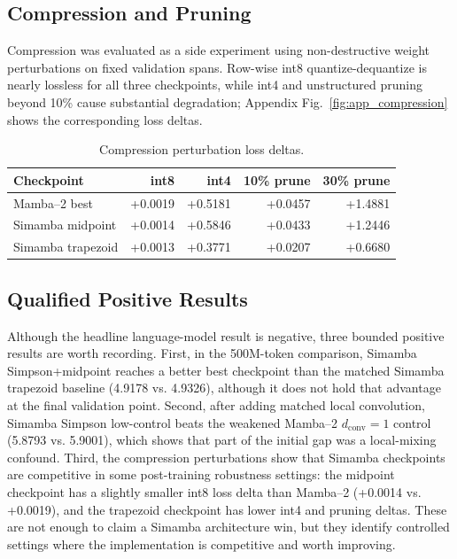 \documentclass[conference]{IEEEtran}
\newcommand{\modelname}{Simamba\xspace}
\newcommand{\mambatwo}{Mamba--2\xspace}
\begin{document}
\subsection{Compression and Pruning}

Compression was evaluated as a side experiment using non-destructive weight perturbations on fixed validation spans. Row-wise int8 quantize-dequantize is nearly lossless for all three checkpoints, while int4 and unstructured pruning beyond 10\% cause substantial degradation; Appendix Fig.~\ref{fig:app_compression} shows the corresponding loss deltas.

\begin{table}[t]
\caption{Compression perturbation loss deltas.}
\label{tab:compression}
\centering
\begin{tabular}{lrrrr}
\toprule
Checkpoint & int8 & int4 & 10\% prune & 30\% prune\\
\midrule
\mambatwo{} best & +0.0019 & +0.5181 & +0.0457 & +1.4881\\
\modelname{} midpoint & +0.0014 & +0.5846 & +0.0433 & +1.2446\\
\modelname{} trapezoid & +0.0013 & +0.3771 & +0.0207 & +0.6680\\
\bottomrule
\end{tabular}
\end{table}

\subsection{Qualified Positive Results}

Although the headline language-model result is negative, three bounded positive results are worth recording. First, in the 500M-token comparison, \modelname{} Simpson+midpoint reaches a better best checkpoint than the matched \modelname{} trapezoid baseline (4.9178 vs. 4.9326), although it does not hold that advantage at the final validation point. Second, after adding matched local convolution, \modelname{} Simpson low-control beats the weakened \mambatwo{} $d_{\mathrm{conv}}=1$ control (5.8793 vs. 5.9001), which shows that part of the initial gap was a local-mixing confound. Third, the compression perturbations show that \modelname{} checkpoints are competitive in some post-training robustness settings: the midpoint checkpoint has a slightly smaller int8 loss delta than \mambatwo{} (+0.0014 vs. +0.0019), and the trapezoid checkpoint has lower int4 and pruning deltas. These are not enough to claim a \modelname{} architecture win, but they identify controlled settings where the implementation is competitive and worth improving.
\end{document}
